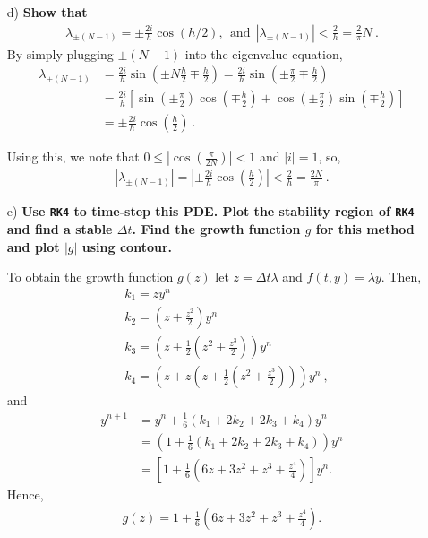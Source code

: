 \begin{enumerate}
\item[d)] \textbf{Show that}
\begin{align*}
\lambda_{\pm(N-1)} = \pm \frac{2i}{h}\cos(h/2), ~~\text{and}~~|\lambda_{\pm(N-1)}| < \frac{2}{h} = \frac{2}{\pi}N~.
\end{align*}
By simply plugging $\pm(N-1)$ into the eigenvalue equation,
\begin{align*}
\lambda_{\pm (N-1)} &= \frac{2i}{h}\sin\left(\pm N\frac{h}{2} \mp \frac{h}{2} \right) = \frac{2i}{h} \sin \left( \pm \frac{\pi}{2} \mp \frac{h}{2}\right) \\
& = \frac{2i}{h} \left[\sin\left(\pm \frac{\pi}{2}\right)\cos\left(\mp\frac{h}{2}\right) + \cos\left(\pm \frac{\pi}{2}\right)\sin\left(\mp\frac{h}{2}\right) \right] \\
& = \pm \frac{2i}{h}\cos\left(\frac{h}{2}\right)~.
\end{align*}

Using this, we note that $0 \leq |\cos\left(\frac{\pi}{2N}\right)| < 1$ and $|i| = 1$, so,
\begin{align*}
|\lambda_{\pm (N-1)}| =\left|\pm \frac{2i}{h}\cos\left(\frac{h}{2}\right)\right| < \frac{2}{h} = \frac{2N}{\pi}~.
\end{align*}
\item[e)] \textbf{Use \texttt{RK4} to time-step this PDE. Plot the stability region of \texttt{RK4} and find a stable $\Delta t$. Find the growth function $g$ for this method and plot $|g|$ using contour.}

To obtain the growth function $g(z)$ let $z = \Delta t \lambda$ and $f(t,y) = \lambda y$. Then,
 \begin{align*}
 & k_1 = zy^n \\
& k_2 = \left(z + \frac{z^2}{2}\right)y^n \\
 & k_3 = \left(z + \frac{1}{2}\left(z^2 + \frac{z^3}{2}\right)\right)y^n \\
 & k_4 = \left(z + z\left(z + \frac{1}{2} \left(z^2+\frac{z^3}{2}\right)\right)\right)y^n ~,
 \end{align*}
and
\begin{align*}
y^{n+1} &= y^n + \frac{1}{6}(k_1 + 2k_2 + 2k_3 + k_4)y^n\\
&=\left(1 + \frac{1}{6}(k_1 + 2k_2 + 2k_3 + k_4)\right)y^n\\
&=\left[1 + \frac{1}{6}\left(6z+3z^2+z^3+\frac{z^4}{4}\right)\right]y^n.
\end{align*}
Hence,
\begin{align*}
g(z) = 1 + \frac{1}{6}\left(6z+3z^2+z^3+\frac{z^4}{4}\right).
\end{align*}


\end{enumerate}

